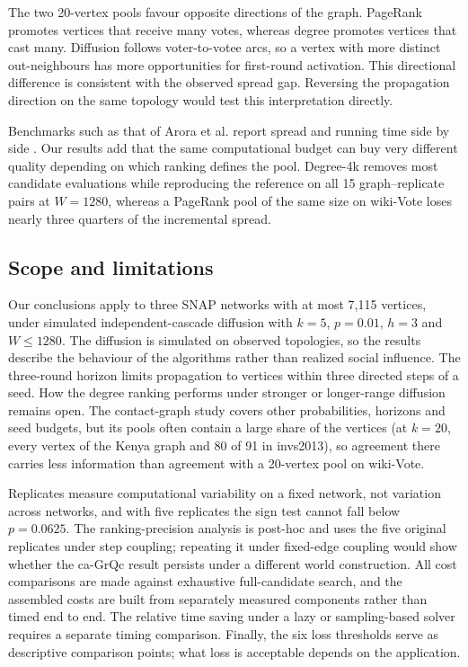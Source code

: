 \documentclass[smallextended]{svjour3}
\begin{document}
The two 20-vertex pools favour opposite directions of the graph. PageRank promotes vertices that receive many votes, whereas degree promotes vertices that cast many. Diffusion follows voter-to-votee arcs, so a vertex with more distinct out-neighbours has more opportunities for first-round activation. This directional difference is consistent with the observed spread gap. Reversing the propagation direction on the same topology would test this interpretation directly.

Benchmarks such as that of Arora et al. report spread and running time side by side \cite{ref16}. Our results add that the same computational budget can buy very different quality depending on which ranking defines the pool. Degree-4k removes most candidate evaluations while reproducing the reference on all 15 graph--replicate pairs at $W=1280$, whereas a PageRank pool of the same size on wiki-Vote loses nearly three quarters of the incremental spread.

\subsection{Scope and limitations}
Our conclusions apply to three SNAP networks with at most 7,115 vertices, under simulated independent-cascade diffusion with $k=5$, $p=0.01$, $h=3$ and $W\le1280$. The diffusion is simulated on observed topologies, so the results describe the behaviour of the algorithms rather than realized social influence. The three-round horizon limits propagation to vertices within three directed steps of a seed. How the degree ranking performs under stronger or longer-range diffusion remains open. The contact-graph study covers other probabilities, horizons and seed budgets, but its pools often contain a large share of the vertices (at $k=20$, every vertex of the Kenya graph and 80 of 91 in invs2013), so agreement there carries less information than agreement with a 20-vertex pool on wiki-Vote.

Replicates measure computational variability on a fixed network, not variation across networks, and with five replicates the sign test cannot fall below $p=0.0625$. The ranking-precision analysis is post-hoc and uses the five original replicates under step coupling; repeating it under fixed-edge coupling would show whether the ca-GrQc result persists under a different world construction. All cost comparisons are made against exhaustive full-candidate search, and the assembled costs are built from separately measured components rather than timed end to end. The relative time saving under a lazy or sampling-based solver requires a separate timing comparison. Finally, the six loss thresholds serve as descriptive comparison points; what loss is acceptable depends on the application.
\end{document}
